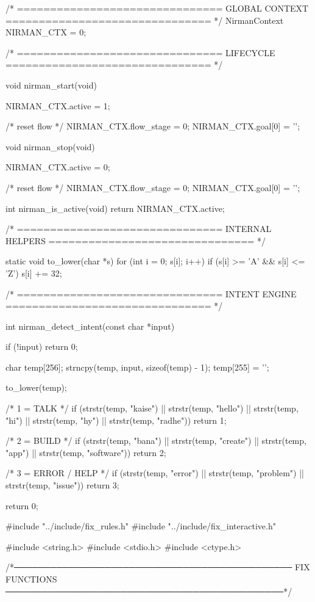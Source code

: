 \documentclass{article}
\begin{document}
/* ===============================
   GLOBAL CONTEXT
   =============================== */
NirmanContext NIRMAN_CTX = {0};

/* ===============================
   LIFECYCLE
   =============================== */

void nirman_start(void)
{
    NIRMAN_CTX.active = 1;

    /* reset flow */
    NIRMAN_CTX.flow_stage = 0;
    NIRMAN_CTX.goal[0] = '\0';
}

void nirman_stop(void)
{
    NIRMAN_CTX.active = 0;

    /* reset flow */
    NIRMAN_CTX.flow_stage = 0;
    NIRMAN_CTX.goal[0] = '\0';
}

int nirman_is_active(void)
{
    return NIRMAN_CTX.active;
}

/* ===============================
   INTERNAL HELPERS
   =============================== */

static void to_lower(char *s)
{
    for (int i = 0; s[i]; i++)
    {
        if (s[i] >= 'A' && s[i] <= 'Z')
            s[i] += 32;
    }
}

/* ===============================
   INTENT ENGINE
   =============================== */

int nirman_detect_intent(const char *input)
{
    if (!input)
        return 0;

    char temp[256];
    strncpy(temp, input, sizeof(temp) - 1);
    temp[255] = '\0';

    to_lower(temp);

    /* 1 = TALK */
    if (strstr(temp, "kaise") ||
        strstr(temp, "hello") ||
        strstr(temp, "hi") ||
        strstr(temp, "hy") ||
        strstr(temp, "radhe"))
    {
        return 1;
    }

    /* 2 = BUILD */
    if (strstr(temp, "bana") ||
        strstr(temp, "create") ||
        strstr(temp, "app") ||
        strstr(temp, "software"))
    {
        return 2;
    }

    /* 3 = ERROR / HELP */
    if (strstr(temp, "error") ||
        strstr(temp, "problem") ||
        strstr(temp, "issue"))
    {
        return 3;
    }

    return 0;
}
#include "../include/fix_rules.h"
#include "../include/fix_interactive.h"

#include <string.h>
#include <stdio.h>
#include <ctype.h>

/*──────────────────────────────────────────────
    FIX FUNCTIONS
──────────────────────────────────────────────*/
\end{document}
